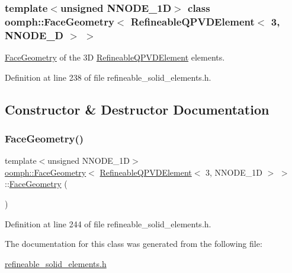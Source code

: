 \subsubsection*{template$<$unsigned N\+N\+O\+D\+E\+\_\+1D$>$\newline
class oomph\+::\+Face\+Geometry$<$ Refineable\+Q\+P\+V\+D\+Element$<$ 3, N\+N\+O\+D\+E\+\_\+D $>$ $>$}

\hyperlink{classoomph_1_1FaceGeometry}{Face\+Geometry} of the 3D \hyperlink{classoomph_1_1RefineableQPVDElement}{Refineable\+Q\+P\+V\+D\+Element} elements. 

Definition at line 238 of file refineable\+\_\+solid\+\_\+elements.\+h.



\subsection{Constructor \& Destructor Documentation}
\mbox{\label{classoomph_1_1FaceGeometry_3_01RefineableQPVDElement_3_013_00_01NNODE__1D_01_4_01_4_ae14ce49ee4b173d33978ab676faf0ed2}} 
\subsubsection{\texorpdfstring{Face\+Geometry()}{FaceGeometry()}}
{\footnotesize\ttfamily template$<$unsigned N\+N\+O\+D\+E\+\_\+1D$>$ \\
\hyperlink{classoomph_1_1FaceGeometry}{oomph\+::\+Face\+Geometry}$<$ \hyperlink{classoomph_1_1RefineableQPVDElement}{Refineable\+Q\+P\+V\+D\+Element}$<$ 3, N\+N\+O\+D\+E\+\_\+1D $>$ $>$\+::\hyperlink{classoomph_1_1FaceGeometry}{Face\+Geometry} (\begin{DoxyParamCaption}{ }\end{DoxyParamCaption})\hspace{0.3cm}{\ttfamily [inline]}}



Definition at line 244 of file refineable\+\_\+solid\+\_\+elements.\+h.



The documentation for this class was generated from the following file\+:\begin{DoxyCompactItemize}
\item 
\hyperlink{refineable__solid__elements_8h}{refineable\+\_\+solid\+\_\+elements.\+h}\end{DoxyCompactItemize}
